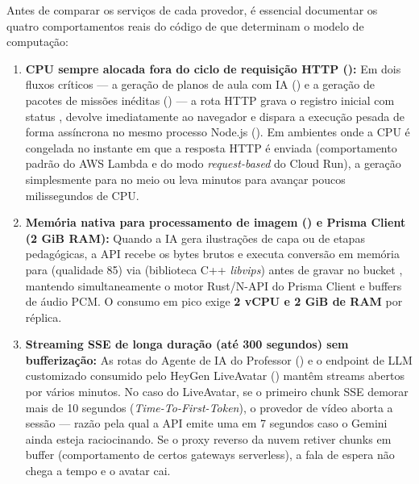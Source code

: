 Antes de comparar os serviços de cada provedor, é essencial documentar os quatro comportamentos reais do código de  que determinam o modelo de computação:

\begin{enumerate}
  \item \textbf{CPU sempre alocada fora do ciclo de requisição HTTP ():}
  Em dois fluxos críticos --- a geração de planos de aula com IA () e a geração de pacotes de missões inéditas () --- a rota HTTP grava o registro inicial com status , devolve \textbf{} imediatamente ao navegador e dispara a execução pesada de forma assíncrona no mesmo processo Node.js (). Em ambientes onde a CPU é congelada no instante em que a resposta HTTP é enviada (comportamento padrão do AWS Lambda e do modo \emph{request-based} do Cloud Run), a geração simplesmente para no meio ou leva minutos para avançar poucos milissegundos de CPU.

  \item \textbf{Memória nativa para processamento de imagem () e Prisma Client (2 GiB RAM):}
  Quando a IA gera ilustrações de capa ou de etapas pedagógicas, a API recebe os bytes brutos e executa conversão em memória para  (qualidade 85) via  (biblioteca C++ \emph{libvips}) antes de gravar no bucket , mantendo simultaneamente o motor Rust/N-API do Prisma Client e buffers de áudio PCM. O consumo em pico exige \textbf{2 vCPU e 2 GiB de RAM} por réplica.

  \item \textbf{Streaming SSE de longa duração (até 300 segundos) sem bufferização:}
  As rotas do Agente de IA do Professor () e o endpoint de LLM customizado consumido pelo HeyGen LiveAvatar () mantêm streams  abertos por vários minutos. No caso do LiveAvatar, se o primeiro chunk SSE demorar mais de 10 segundos (\emph{Time-To-First-Token}), o provedor de vídeo aborta a sessão --- razão pela qual a API emite uma  em 7 segundos caso o Gemini ainda esteja raciocinando. Se o proxy reverso da nuvem retiver chunks em buffer (comportamento de certos gateways serverless), a fala de espera não chega a tempo e o avatar cai.


\end{enumerate}
